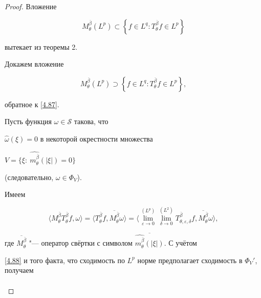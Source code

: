 \begin{proof}

Вложение

\begin{equation}\label{4.87}

  M_\theta^{\overline{\beta}}(L^p)\subset\left\{f\in L^q: T_\theta^{\overline{\beta}} f\in

    L^p\right\}\end{equation}

вытекает из теоремы 2.



Докажем вложение

$$\label{4.70}

  M_\theta^{\overline{\beta}}(L^p)\supset\left\{f\in L^q: T_\theta^{\overline{\beta}} f\in

    L^p\right\},$$

обратное к \eqref{4.87}.

 Пусть функция $\omega\in \mathcal{S}$ такова, что

$\widehat{\omega}(\xi)=0$ в некоторой окрестности множества

$V=\{\xi:\ \widehat{m_{\theta}^{\overline{\beta}}}(|\xi|)=0\}$

(следовательно, $\omega\in\Phi_V$).



Имеем

\begin{equation}\label{4.88}

 \langle M_\theta^{\overline{\beta}}T_\theta^{\overline{\beta}}f,

 \omega\rangle=\langle T_\theta^{\overline{\beta}}f,

 \overline{M_\theta^{\overline{\beta}}}\omega\rangle=\langle \lim\limits_{\varepsilon\to 0}^{(L^p)}

 \lim\limits_{\delta\to 0}^{(L^2)} T_{\theta,\varepsilon,\delta}^{\overline{\beta}}f,

 \overline{M_\theta^{\overline{\beta}}}\omega\rangle,

\end{equation}

где $\overline{M_\theta^{\overline{\beta}}}$ "--- оператор свёртки с символом $\overline{\widehat{m_{\theta}^{\overline{\beta}}}(|\xi|)}$. С учётом

\eqref{4.88} и того факта, что сходимость по $L^p$ норме предполагает сходимость в $\Phi_V'$, получаем

\begin{multline}\label{4.89}


\end{multline}
\end{proof}
